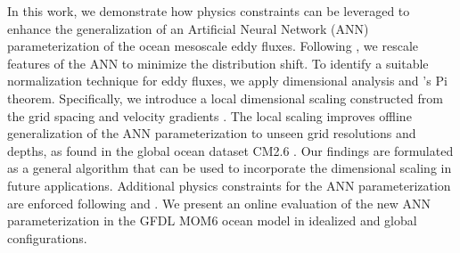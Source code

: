 \documentclass[draft]{agujournal2019}
\begin{document}
In this work, we demonstrate how physics constraints can be leveraged to enhance the generalization of an Artificial Neural Network (ANN) parameterization of the ocean mesoscale eddy fluxes. Following , we rescale features of the ANN to minimize the distribution shift. To identify a suitable normalization technique for eddy fluxes, we apply dimensional analysis and 's Pi theorem. Specifically, we introduce a local dimensional scaling constructed from the grid spacing and velocity gradients \cite{prakash2022invariant}. The local scaling improves offline generalization of the ANN parameterization to unseen grid resolutions and depths, as found in the global ocean dataset CM2.6 \cite{griffies2015impacts}. Our findings are formulated as a general algorithm that can be used to incorporate the dimensional scaling in future applications. Additional physics constraints for the ANN parameterization are enforced following  and . %
We present an online evaluation of the new ANN parameterization in the GFDL MOM6 ocean model \cite{adcroft2019gfdl} in idealized and global configurations.

\end{document}
